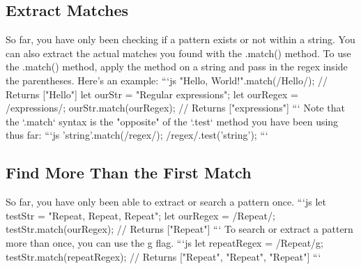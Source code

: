 \documentclass{article}%
\begin{document}
\subsection{Extract Matches}%
\label{subsec:ExtractMatches}%
So far, you have only been checking if a pattern exists or not within a string. You can also extract the actual matches you found with the .match() method.\newline%
To use the .match() method, apply the method on a string and pass in the regex inside the parentheses. \newline%
Here's an example:\newline%
```js\newline%
"Hello, World!".match(/Hello/);\newline%
// Returns {[}"Hello"{]}\newline%
let ourStr = "Regular expressions";\newline%
let ourRegex = /expressions/;\newline%
ourStr.match(ourRegex);\newline%
// Returns {[}"expressions"{]}\newline%
```\newline%
Note that the `.match` syntax is the "opposite" of the `.test` method you have been using thus far:\newline%
```js\newline%
'string'.match(/regex/);\newline%
/regex/.test('string');\newline%
```\newline%

%
\subsection{Find More Than the First Match}%
\label{subsec:FindMoreThantheFirstMatch}%
So far, you have only been able to extract or search a pattern once.\newline%
```js\newline%
let testStr = "Repeat, Repeat, Repeat";\newline%
let ourRegex = /Repeat/;\newline%
testStr.match(ourRegex);\newline%
// Returns {[}"Repeat"{]}\newline%
```\newline%
To search or extract a pattern more than once, you can use the g flag.\newline%
```js\newline%
let repeatRegex = /Repeat/g;\newline%
testStr.match(repeatRegex);\newline%
// Returns {[}"Repeat", "Repeat", "Repeat"{]}\newline%
```\newline%
\end{document}
